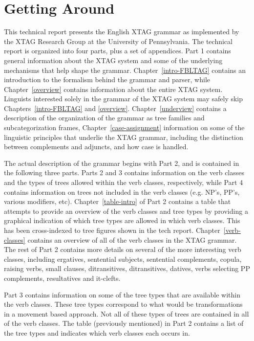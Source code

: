 \chapter{Getting Around}

This technical report presents the English XTAG grammar as implemented by
the XTAG Research Group at the University of Pennsylvania.  The technical
report is organized into four parts, plus a set of appendices.  Part 1
contains general information about the XTAG system and some of the
underlying mechanisms that help shape the grammar.
Chapter~\ref{intro-FBLTAG} contains an introduction to the formalism behind
the grammar and parser, while Chapter~\ref{overview} contains information
about the entire XTAG system.  Linguists interested solely in the grammar
of the XTAG system may safely skip Chapters~\ref{intro-FBLTAG} and
\ref{overview}.  Chapter~\ref{underview} contains a description of the
organization of the grammar as tree families and subcategorization frames,
Chapter~\ref{case-assignment} information on some of the linguistic
principles that underlie the XTAG grammar, including the distinction
between complements and adjuncts, and how case is handled.

The actual description of the grammar begins with Part 2, and is contained
in the following three parts.  Parts 2 and 3 contains information on the
verb classes and the types of trees allowed within the verb classes,
respectively, while Part 4 contains information on trees not included in
the verb classes (e.g.  NP's, PP's, various modifiers, etc).
Chapter~\ref{table-intro} of Part 2 contains a table that attempts to
provide an overview of the verb classes and tree types by providing a
graphical indication of which tree types are allowed in which verb classes.
This has been cross-indexed to tree figures shown in the tech report.
Chapter~\ref{verb-classes} contains an overview of all of the verb classes
in the XTAG grammar.  The rest of Part 2 contains more details on several
of the more interesting verb classes, including ergatives, sentential
subjects, sentential complements, copula, raising verbs, small clauses,
ditransitives, ditransitives, datives, verbs selecting PP complements,
resultatives and it-clefts.

Part 3 contains information on some of the tree types that are available within
the verb classes.  These tree types correspond to what would be transformations
in a movement based approach.  Not all of these types of trees are contained in
all of the verb classes.  The table (previously mentioned) in Part 2 contains a
list of the tree types and indicates which verb classes each occurs in.  

